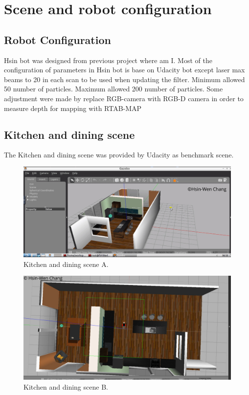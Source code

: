 \documentclass[10pt,journal,compsoc]{IEEEtran}
\begin{document}
\section{Scene and robot configuration}
\subsection{Robot Configuration}
Hsin bot was designed from previous project where am I. Most of the configuration of parameters in Hsin bot is base on Udacity bot except laser max beams to 20 in each scan to be used when updating the filter. Minimum allowed 50 number of particles. Maximum allowed 200 number of particles. Some adjustment were made by replace RGB-camera with RGB-D camera in order to measure depth for mapping with RTAB-MAP
\subsection{Kitchen and dining scene}
The Kitchen and dining scene was provided by Udacity as benchmark scene.
\begin{figure}[thpb]
      \centering
      \includegraphics[width=\linewidth]{MapMyworld.png}
      \caption{Kitchen and dining scene A.}
      \label{fig:robot1}
\end{figure}
\begin{figure}[thpb]
      \centering
      \includegraphics[width=\linewidth]{HsinBot.png}
      \caption{Kitchen and dining scene B.}
      \label{fig:robot1}
\end{figure}
\end{document}
